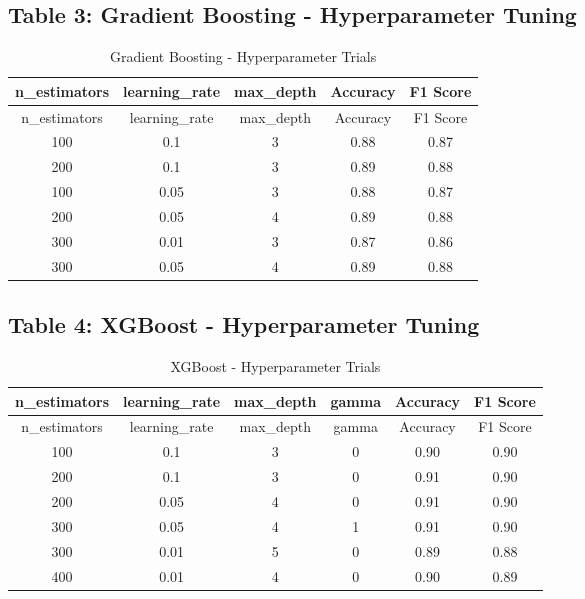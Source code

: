 \documentclass[11pt]{article}
\begin{document}
\bigskip

\subsection{Table 3: Gradient Boosting - Hyperparameter Tuning}
\begin{longtable}{c c c c c}
\caption{Gradient Boosting - Hyperparameter Trials}\\
\toprule
n\_estimators & learning\_rate & max\_depth & Accuracy & F1 Score \\
\midrule
\endfirsthead
\toprule
n\_estimators & learning\_rate & max\_depth & Accuracy & F1 Score \\
\midrule
\endhead
100 & 0.1 & 3 & 0.88 & 0.87 \\
200 & 0.1 & 3 & 0.89 & 0.88 \\
100 & 0.05 & 3 & 0.88 & 0.87 \\
200 & 0.05 & 4 & 0.89 & 0.88 \\
300 & 0.01 & 3 & 0.87 & 0.86 \\
300 & 0.05 & 4 & 0.89 & 0.88 \\
\bottomrule
\end{longtable}

\bigskip

\subsection{Table 4: XGBoost - Hyperparameter Tuning}
\begin{longtable}{c c c c c c}
\caption{XGBoost - Hyperparameter Trials}\\
\toprule
n\_estimators & learning\_rate & max\_depth & gamma & Accuracy & F1 Score \\
\midrule
\endfirsthead
\toprule
n\_estimators & learning\_rate & max\_depth & gamma & Accuracy & F1 Score \\
\midrule
\endhead
100 & 0.1 & 3 & 0 & 0.90 & 0.90 \\
200 & 0.1 & 3 & 0 & 0.91 & 0.90 \\
200 & 0.05 & 4 & 0 & 0.91 & 0.90 \\
300 & 0.05 & 4 & 1 & 0.91 & 0.90 \\
300 & 0.01 & 5 & 0 & 0.89 & 0.88 \\
400 & 0.01 & 4 & 0 & 0.90 & 0.89 \\
\bottomrule
\end{longtable}
\end{document}
